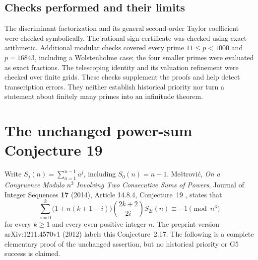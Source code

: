 \documentclass[11pt,a4paper]{article}
\theoremstyle{definition}
\theoremstyle{remark}
\begin{document}
\subsection{Checks performed and their limits}

The discriminant factorization and its general second-order Taylor
coefficient were checked symbolically.  The rational sign certificate
was checked using exact arithmetic.  Additional modular checks
covered every prime $11\le p<1000$ and $p=16843$, including a
Wolstenholme case; the four smaller primes were evaluated as exact
fractions.  The telescoping identity and its valuation refinement
were checked over finite grids.  These checks supplement the
proofs and help detect transcription errors.  They neither establish
historical priority nor turn a statement about finitely many primes
into an infinitude theorem.

\appendix
\section{The unchanged power-sum Conjecture 19}
\label{app:powers}

Write $S_j(n)=\sum_{a=1}^{n-1}a^j$, including $S_0(n)=n-1$.
Me\v{s}trovi\'c, \emph{On a Congruence Modulo $n^3$ Involving Two
Consecutive Sums of Powers}, Journal of Integer Sequences
\textbf{17} (2014), Article 14.8.4, Conjecture~19 \cite{Mestrovic2014sums}, states that
\begin{equation}\label{eq:conj19}
 \sum_{i=0}^{k}\bigl(1+n(k+1-i)\bigr)
 \binom{2k+2}{2i}S_{2i}(n)\equiv-1\pmod{n^3}
\end{equation}
for every $k\ge1$ and every even positive integer $n$.
The preprint version arXiv:1211.4570v1 (2012) labels this
Conjecture~2.17.  The following is a complete elementary proof of the
unchanged assertion, but no historical priority or G5 success is claimed.
\end{document}
